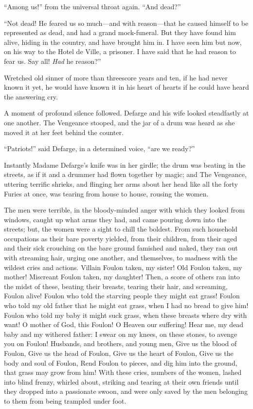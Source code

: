 ``Among us!'' from the universal throat again.  ``And dead?''

``Not dead!  He feared us so much---and with reason---that he caused
himself to be represented as dead, and had a grand mock-funeral.  But
they have found him alive, hiding in the country, and have brought him
in.  I have seen him but now, on his way to the Hotel de Ville, a
prisoner.  I have said that he had reason to fear us.  Say all!
\emph{Had} he reason?''

Wretched old sinner of more than threescore years and ten, if he had
never known it yet, he would have known it in his heart of hearts if
he could have heard the answering cry.

A moment of profound silence followed.  Defarge and his wife looked
steadfastly at one another.  The Vengeance stooped, and the jar of
a drum was heard as she moved it at her feet behind the counter.

``Patriots!'' said Defarge, in a determined voice, ``are we ready?''

Instantly Madame Defarge's knife was in her girdle; the drum was beating
in the streets, as if it and a drummer had flown together by magic; and
The Vengeance, uttering terrific shrieks, and flinging her arms about
her head like all the forty Furies at once, was tearing from house to
house, rousing the women.

The men were terrible, in the bloody-minded anger with which they looked
from windows, caught up what arms they had, and came pouring down into
the streets; but, the women were a sight to chill the boldest.  From
such household occupations as their bare poverty yielded, from their
children, from their aged and their sick crouching on the bare ground
famished and naked, they ran out with streaming hair, urging one
another, and themselves, to madness with the wildest cries and actions.
Villain Foulon taken, my sister!  Old Foulon taken, my mother!
Miscreant Foulon taken, my daughter!  Then, a score of others ran into
the midst of these, beating their breasts, tearing their hair, and
screaming, Foulon alive!  Foulon who told the starving people they
might eat grass!  Foulon who told my old father that he might eat
grass, when I had no bread to give him!  Foulon who told my baby it
might suck grass, when these breasts where dry with want!  O mother
of God, this Foulon!  O Heaven our suffering!  Hear me, my dead baby
and my withered father:  I swear on my knees, on these stones, to avenge
you on Foulon!  Husbands, and brothers, and young men, Give us the blood
of Foulon, Give us the head of Foulon, Give us the heart of Foulon,
Give us the body and soul of Foulon, Rend Foulon to pieces, and dig
him into the ground, that grass may grow from him!  With these cries,
numbers of the women, lashed into blind frenzy, whirled about, striking
and tearing at their own friends until they dropped into a passionate
swoon, and were only saved by the men belonging to them from being
trampled under foot.

